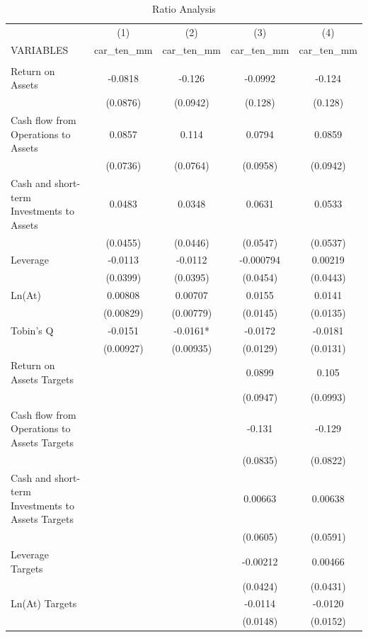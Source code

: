 \documentclass[12pt]{article}
\begin{document}
	\begin{table}[ht]
		\centering
		\caption{Ratio Analysis}

		\begin{adjustbox}{height=10cm, max width=\textwidth}
			\begin{tabular}{lcccc} \hline
				& (1) & (2) & (3) & (4) \\
			   VARIABLES & car\_ten\_mm & car\_ten\_mm & car\_ten\_mm & car\_ten\_mm \\ \hline
				&  &  &  &  \\
			   Return on Assets & -0.0818 & -0.126 & -0.0992 & -0.124 \\
				& (0.0876) & (0.0942) & (0.128) & (0.128) \\
			   Cash flow from Operations to Assets & 0.0857 & 0.114 & 0.0794 & 0.0859 \\
				& (0.0736) & (0.0764) & (0.0958) & (0.0942) \\
			   Cash and short-term Investments to Assets & 0.0483 & 0.0348 & 0.0631 & 0.0533 \\
				& (0.0455) & (0.0446) & (0.0547) & (0.0537) \\
			   Leverage & -0.0113 & -0.0112 & -0.000794 & 0.00219 \\
				& (0.0399) & (0.0395) & (0.0454) & (0.0443) \\
			   Ln(At) & 0.00808 & 0.00707 & 0.0155 & 0.0141 \\
				& (0.00829) & (0.00779) & (0.0145) & (0.0135) \\
			   Tobin's Q & -0.0151 & -0.0161* & -0.0172 & -0.0181 \\
				& (0.00927) & (0.00935) & (0.0129) & (0.0131) \\
			   Return on Assets Targets &  &  & 0.0899 & 0.105 \\
				&  &  & (0.0947) & (0.0993) \\
			   Cash flow from Operations to Assets Targets &  &  & -0.131 & -0.129 \\
				&  &  & (0.0835) & (0.0822) \\
			   Cash and short-term Investments to Assets Targets &  &  & 0.00663 & 0.00638 \\
				&  &  & (0.0605) & (0.0591) \\
			   Leverage Targets &  &  & -0.00212 & 0.00466 \\
				&  &  & (0.0424) & (0.0431) \\
			   Ln(At) Targets &  &  & -0.0114 & -0.0120 \\
				&  &  & (0.0148) & (0.0152) \\

\end{tabular}
\end{adjustbox}
\end{table}
\end{document}
